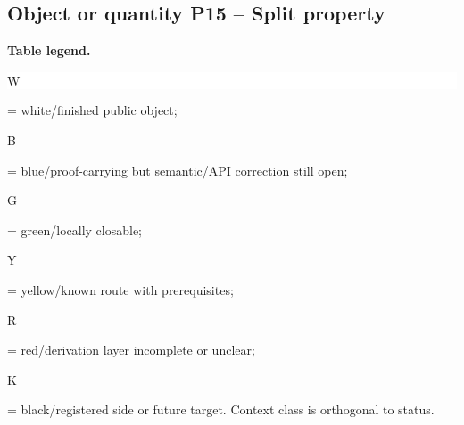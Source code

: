 \subsection*{Object or quantity P15 -- Split property}
\hypertarget{objproof:P15}{}
\par\smallskip\noindent\begin{minipage}{0.99\linewidth}\footnotesize\raggedright\textbf{Table legend.} \colorbox{white}{\strut W} = white/finished public object; \colorbox{cyan!20}{\strut B} = blue/proof-carrying but semantic/API correction still open; \colorbox{green!18}{\strut G} = green/locally closable; \colorbox{yellow!25}{\strut Y} = yellow/known route with prerequisites; \colorbox{red!20}{\strut R} = red/derivation layer incomplete or unclear; \colorbox{black!18}{\strut K} = black/registered side or future target. Context class is orthogonal to status.\end{minipage}\par\vspace{0.25em}
